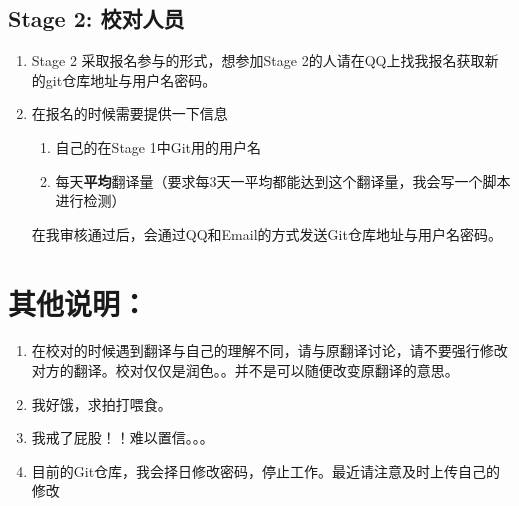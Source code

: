 \documentclass[10pt,a4paper,UTF8]{article}
\begin{document}
    	\subsection{Stage 2: 校对人员}
			\begin{enumerate}
    			\item Stage 2 采取报名参与的形式，想参加Stage 2的人请在QQ上找我报名获取新的git仓库地址与用户名密码。
    			\item 在报名的时候需要提供一下信息
    				\begin{enumerate}
		    			\item 自己的在Stage 1中Git用的用户名
		    			\item 每天\textbf{平均}翻译量（要求每3天一平均都能达到这个翻译量，我会写一个脚本进行检测）
		    		\end{enumerate}
		    		在我审核通过后，会通过QQ和Email的方式发送Git仓库地址与用户名密码。
    		\end{enumerate}    		

    \section{其他说明：}
    	\begin{enumerate}
			\item 在校对的时候遇到翻译与自己的理解不同，请与原翻译讨论，请不要强行修改对方的翻译。校对仅仅是润色。。并不是可以随便改变原翻译的意思。

			\item 我好饿，求拍打喂食。

			\item 我戒了屁股！！难以置信。。。

			\item 目前的Git仓库，我会择日修改密码，停止工作。最近请注意及时上传自己的修改

		\end{enumerate}
\end{document}
